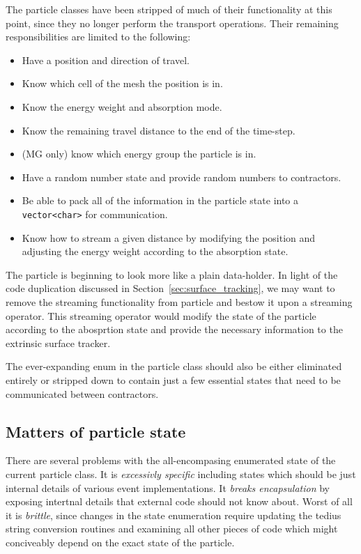 \documentclass[memo]{ResearchNote}
\begin{document}
The particle classes have been stripped of much of their functionality
at this point, since they no longer perform the transport
operations. Their remaining responsibilities are limited to the
following:
\begin{itemize}
  \item Have a position and direction of travel. 
  \item Know which cell of the mesh the position is in.
  \item Know the energy weight and absorption mode.
  \item Know the remaining travel distance to the end of the
    time-step.
  \item (MG only) know which energy group the particle is in.
  \item Have a random number state and provide random numbers to
    contractors.
  \item Be able to pack all of the information in the particle state
    into a {\tt vector<char>} for communication.
  \item Know how to stream a given distance by modifying the position
    and adjusting the energy weight according to the absorption state.
\end{itemize}

The particle is beginning to look more like a plain data-holder. In
light of the code duplication discussed in
Section~\ref{sec:surface_tracking}, we may want to remove the
streaming functionality from particle and bestow it upon a streaming
operator. This streaming operator would modify the state of the
particle according to the abosprtion state and provide the necessary
information to the extrinsic surface tracker.

The ever-expanding enum in the particle class should also be either
eliminated entirely or stripped down to contain just a few essential
states that need to be communicated between contractors.

\subsection{Matters of particle state} \label{sec:State}

There are several problems with the all-encompasing enumerated state
of the current particle class. It is {\em excessivly specific}
including states which should be just internal details of various
event implementations. It {\em breaks encapsulation} by exposing
intertnal details that external code should not know about. Worst of
all it is {\em brittle}, since changes in the state enumeration
require updating the tedius string conversion routines and examining
all other pieces of code which might conciveably depend on the exact
state of the particle.
\end{document}
